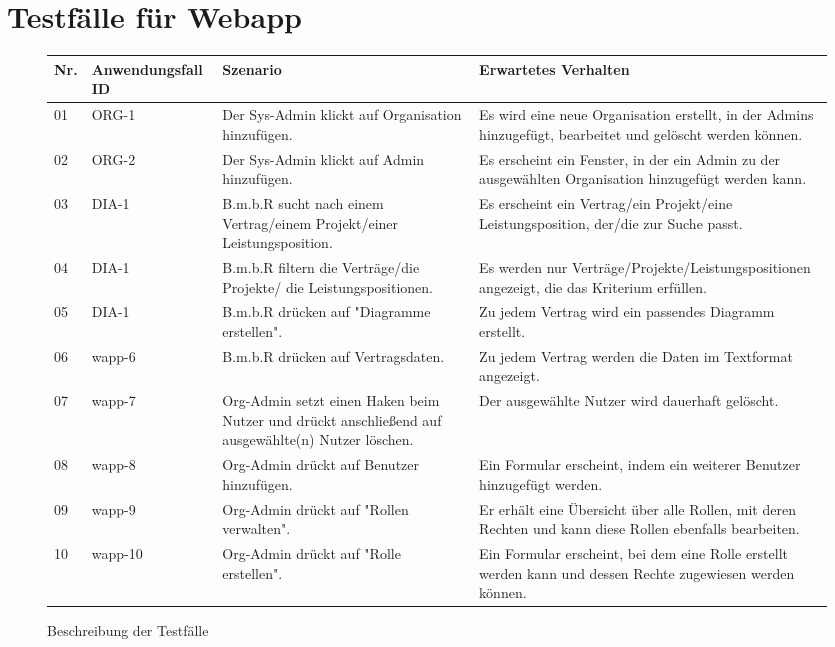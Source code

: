 \section{Testfälle für Webapp}
\begin{figure}[!h]
	\begin{center}
		\begin{tabularx}{\textwidth}{ p{} | p{} | p{} | X }
			\textbf{Nr.} & \textbf{Anwendungsfall ID} & \textbf{Szenario} & \textbf{Erwartetes Verhalten} \\ \hline
			01 & ORG-1 & Der Sys-Admin klickt auf Organisation hinzufügen. & Es wird eine neue Organisation erstellt, in der Admins hinzugefügt, bearbeitet und gelöscht werden können. \\ \hline
			02 & ORG-2 & Der Sys-Admin klickt auf Admin hinzufügen. & Es erscheint ein Fenster, in der ein Admin zu der ausgewählten Organisation hinzugefügt werden kann. \\ \hline
			03 & DIA-1 & B.m.b.R sucht nach einem Vertrag/einem Projekt/einer Leistungsposition. & Es erscheint ein Vertrag/ein Projekt/eine Leistungsposition, der/die zur Suche passt. \\ \hline
			04 & DIA-1 & B.m.b.R filtern die Verträge/die Projekte/ die Leistungspositionen. & Es werden nur Verträge/Projekte/Leistungspositionen angezeigt, die das Kriterium erfüllen. \\ \hline
			05 & DIA-1 & B.m.b.R drücken auf "Diagramme erstellen". & Zu jedem Vertrag wird ein passendes Diagramm erstellt. \\ \hline
			06 & wapp-6 & B.m.b.R drücken auf Vertragsdaten. & Zu jedem Vertrag werden die Daten im Textformat angezeigt. \\ \hline 
			07 & wapp-7 & Org-Admin setzt einen Haken beim Nutzer und drückt anschließend auf ausgewählte(n) Nutzer löschen. & Der ausgewählte Nutzer wird dauerhaft gelöscht. \\ \hline
			08 & wapp-8 & Org-Admin drückt auf Benutzer hinzufügen. & Ein Formular erscheint, indem ein weiterer Benutzer hinzugefügt werden. \\ \hline
			09 & wapp-9 & Org-Admin drückt auf "Rollen verwalten". & Er erhält eine Übersicht über alle Rollen, mit deren Rechten und kann diese Rollen ebenfalls bearbeiten. \\ \hline
			10 & wapp-10 & Org-Admin drückt auf "Rolle erstellen". & Ein Formular erscheint, bei dem eine Rolle erstellt werden kann und dessen Rechte zugewiesen werden können. \\ \hline
		\end{tabularx}	
	\end{center}
	\caption{Beschreibung der Testfälle}
	\label{fig:testfaelle-web-app-tabelle}
\end{figure}

